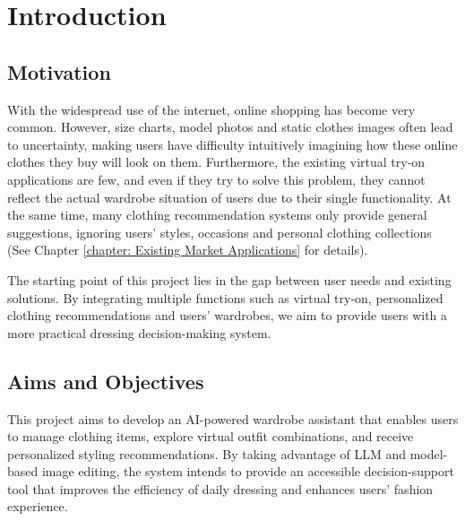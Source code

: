 \chapter{Introduction}
\label{ch:introduction}

\section{Motivation}
With the widespread use of the internet, online shopping has become very common. However, size charts, model photos and static clothes images often lead to uncertainty, making users have difficulty intuitively imagining how these online clothes they buy will look on them. Furthermore, the existing virtual try-on applications are few, and even if they try to solve this problem, they cannot reflect the actual wardrobe situation of users due to their single functionality. At the same time, many clothing recommendation systems only provide general suggestions, ignoring users' styles, occasions and personal clothing collections (See Chapter \ref{chapter: Existing Market Applications} for details).

The starting point of this project lies in the gap between user needs and existing solutions. By integrating multiple functions such as virtual try-on, personalized clothing recommendations and users' wardrobes, we aim to provide users with a more practical dressing decision-making system.

\section{Aims and Objectives}
This project aims to develop an AI-powered wardrobe assistant that enables users to manage clothing items, explore virtual outfit combinations, and receive personalized styling recommendations. By taking advantage of LLM and model-based image editing, the system intends to provide an accessible decision-support tool that improves  the efficiency of daily dressing and enhances users' fashion experience.

